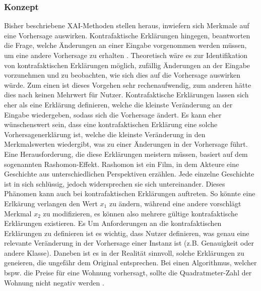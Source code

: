 \subsubsection{Konzept}
Bisher beschriebene XAI-Methoden stellen heraus, inwiefern sich Merkmale auf eine Vorhersage auswirken. Kontrafaktische Erklärungen hingegen, beantworten die Frage, welche Änderungen an einer Eingabe vorgenommen werden müssen, um eine andere Vorhersage zu erhalten \cite{Nandi.2022}. Theoretisch wäre es zur Identifikation von kontrafaktischen Erklärungen möglich, zufällig Änderungen an der Eingabe vorzunehmen und zu beobachten, wie sich dies auf die Vorhersage auswirken würde. Zum einen ist dieses Vorgehen sehr rechenaufwendig, zum anderen hätte dies nach \textcite{molnar2022} keinen Mehrwert für Nutzer. Kontrafaktische Erklärungen lassen sich eher als eine Erklärung definieren, welche die kleinste Veränderung an der Eingabe wiedergeben, sodass sich die Vorhersage ändert. Es kann eher wünschenswert sein, dass eine kontrafaktischen Erklärung eine solche Vorhersagenerklärung ist, welche die kleinste Veränderung in den Merkmalswerten wiedergibt, was zu einer Änderungen in der Vorhersage führt. Eine Herausforderung, die diese Erklärungen meistern müssen, basiert auf dem sogenannten Rashomon-Effekt. Rashomon ist ein Film, in dem Akteure eine Geschichte aus unterschiedlichen Perspektiven erzählen. Jede einzelne Geschichte ist in sich schlüssig, jedoch widersprechen sie sich untereinander. Dieses Phänomen kann auch bei kontrafaktischen Erklärungen auftreten. So könnte eine Erlkärung verlangen den Wert $x_1$ zu ändern, während eine andere vorschlägt Merkmal $x_2$ zu modifizieren, es können also mehrere gültige kontrafaktische Erklärungen existieren. Es Um Anforderungen an die kontrafaktischen Erklärungen zu definieren ist es wichtig, dass Nutzer definieren, was genau eine relevante Veränderung in der Vorhersage einer Instanz ist (z.B. Genauigkeit oder andere Klasse). 
Daneben ist es in der Realität sinnvoll, solche Erklärungen zu geneieren, die ungefähr dem Original entsprechen. Bei einen Algorithmus, welcher bspw. die Preise für eine Wohnung vorhersagt, sollte die Quadratmeter-Zahl der Wohnung nicht negativ werden \cite{molnar2022}.


